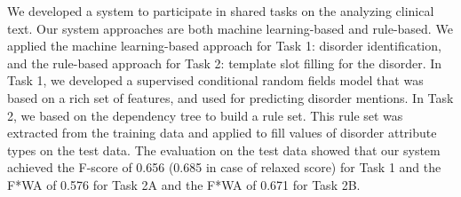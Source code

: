 We developed a system to participate in shared tasks on the analyzing clinical text. Our system approaches are both machine learning-based and rule-based. We applied the machine learning-based approach for Task 1: disorder identification, and the rule-based approach for Task 2: template slot filling for the disorder. In Task 1, we developed a supervised conditional random fields model that was based on a rich set of features, and used for predicting disorder mentions. In Task 2, we based on the dependency tree to build a rule set. This rule set was extracted from the training data and applied to fill values of disorder attribute types on the test data. The evaluation on the test data showed that our system achieved the F-score of 0.656 (0.685 in case of relaxed score) for Task 1 and the F*WA of 0.576 for Task 2A and the F*WA of 0.671 for Task 2B.
